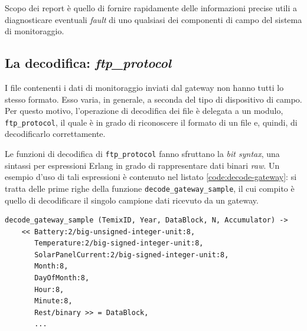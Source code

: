%
Scopo dei report \`e quello di fornire rapidamente delle informazioni precise utili a diagnosticare 
eventuali \emph{fault} di uno qualsiasi dei componenti di campo del sistema di monitoraggio.
%

%
\subsection{La decodifica: \emph{ftp\_protocol}}
%
I file contenenti i dati di monitoraggio inviati dal gateway non hanno tutti lo stesso formato.
%
Esso varia, in generale, a seconda del tipo di dispositivo di campo. Per questo motivo, 
l'operazione di decodifica dei file \`e delegata a un modulo, \texttt{ftp\_protocol}, 
il quale \`e in grado di riconoscere il formato di un file e, quindi, di decodificarlo 
correttamente.
%

%
Le funzioni di decodifica di \texttt{ftp\_protocol} fanno sfruttano la \emph{bit syntax}, una 
sintassi per espressioni Erlang in grado di rappresentare dati binari \emph{raw}.
%
Un esempio d'uso di tali espressioni \`e contenuto nel listato \ref{code:decode-gateway}: si tratta
delle prime righe della funzione \texttt{decode\_gateway\_sample}, il cui compito \`e quello di 
decodificare il singolo campione dati ricevuto da un gateway.
%
\begin{lstlisting}[caption={Decodifica di un blocco dati del Gateway}, label={code:decode-gateway},frame=trBL]
decode_gateway_sample (TemixID, Year, DataBlock, N, Accumulator) ->
    << Battery:2/big-unsigned-integer-unit:8,
       Temperature:2/big-signed-integer-unit:8,
       SolarPanelCurrent:2/big-signed-integer-unit:8,
       Month:8,
       DayOfMonth:8,
       Hour:8,
       Minute:8,
       Rest/binary >> = DataBlock,
       ...
\end{lstlisting}
%

%

%

